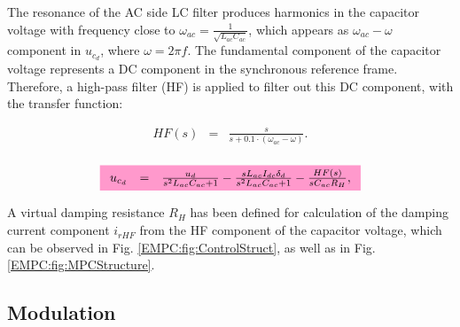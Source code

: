      The resonance of the AC side LC filter produces harmonics in the capacitor voltage with frequency close to $\omega_{ac}=\frac{1}{\sqrt{L_{ac}C_{ac}}}$, which appears as $\omega_{ac}-\omega$ component in $u_{c_d}$, where $\omega=2\pi f$. The fundamental component of the capacitor voltage represents a DC component in the synchronous reference frame. Therefore, a high-pass filter (HF) is applied to filter out this DC component, with the transfer function:

    \begin{equation}
        \begin{array}{rcl}
            HF(s)&=&\frac{s}{s+0.1\cdot(\omega_{ac}-\omega)}.\\
        \end{array}
        \label{EMPC:equ:AC_HPF}
    \end{equation}


    \begin{equation}
    \hlcmath{PT}{
        \begin{array}{rcl}
        u_{c_d}&=&\frac{u_d}{s^2L_{ac}C_{ac}+1}-\frac{sL_{ac}I_{dc}\delta_d}{s^2L_{ac}C_{ac}+1}-\frac{HF(s)}{sC_{ac}R_H},\\
        \end{array}}
        \label{EMPC:equ:reduced_ucd}
    \end{equation}


    A virtual damping resistance $R_H$ has been defined for calculation of the damping current component $i_{rHF}$ from the HF component of the capacitor voltage, which can be observed in Fig. \ref{EMPC:fig:ControlStruct}, as well as in Fig. \ref{EMPC:fig:MPCStructure}.

\subsection{Modulation}\label{EMPC:sec:Modulation}


